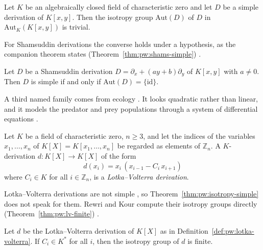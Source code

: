 \begin{theorem}\label{thm:pw:isotropy-simple}
Let $K$ be an algebraically closed field of characteristic zero and let
$D$ be a simple derivation of $K[x,y]$. Then the isotropy group
$\mathrm{Aut}(D)$ of $D$ in $\mathrm{Aut}_{K}(K[x,y])$ is trivial.
\end{theorem}

For Shamsuddin derivations the converse holds under a hypothesis, as the
companion theorem states (Theorem~\ref{thm:pw:shams-simple}) \cite[p.~2]{MendesPan2017}.

\begin{theorem}\label{thm:pw:shams-simple}
Let $D$ be a Shamsuddin derivation $D=\partial_{x}+(ay+b)\partial_{y}$ of
$K[x,y]$ with $a\neq 0$. Then $D$ is simple if and only if
$\mathrm{Aut}(D)=\{\mathrm{id}\}$.
\end{theorem}

A third named family comes from ecology \cite[p.~2]{RewriKour2025}. It
looks quadratic rather than linear, and it models the predator and prey
populations through a system of differential equations
\cite[p.~2]{RewriKour2025}.

\begin{definition}\label{def:pw:lotka-volterra}
Let $K$ be a field of characteristic zero, $n\geq 3$, and let the indices
of the variables $x_{1},\dots,x_{n}$ of $K[X]=K[x_{1},\dots,x_{n}]$ be
regarded as elements of $\mathbb{Z}_{n}$. A $K$-derivation
$d\colon K[X]\to K[X]$ of the form
\begin{equation*}
d(x_{i})=x_{i}\,(x_{i-1}-C_{i}\,x_{i+1})
\end{equation*}
where $C_{i}\in K$ for all $i\in\mathbb{Z}_{n}$, is a
\emph{Lotka--Volterra derivation}.
\end{definition}

Lotka--Volterra derivations are not simple \cite[p.~2]{RewriKour2025}, so
Theorem~\ref{thm:pw:isotropy-simple} does not speak for them. Rewri and
Kour compute their isotropy groups directly (Theorem~\ref{thm:pw:lv-finite})
\cite[pp.~21--23]{RewriKour2025}.\begin{theorem}\label{thm:pw:lv-finite}
Let $d$ be the Lotka--Volterra derivation of $K[X]$ as in
Definition~\ref{def:pw:lotka-volterra}. If $C_{i}\in K^{*}$ for all $i$,
then the isotropy group of $d$ is finite.
\end{theorem}

